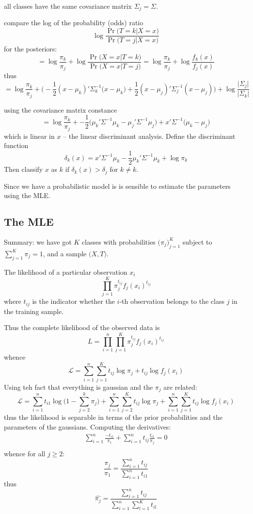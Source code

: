 \documentclass[a4paper]{article}
\begin{document}
all classes have the same covariance matrix $\Sigma_j = \Sigma$.

compare the log of the probability (odds) ratio
\[\log \frac{\Pr\big(T=k\vert X=x\big)}{\Pr\big(T=j\vert X=x\big)} \]
for the posteriors:
\[ = \log \frac{\pi_k}{\pi_j} + \log \frac{\Pr\big(X=x\vert T=k\big)}{\Pr\big(X=x\vert T=j\big)} = \log \frac{\pi_k}{\pi_j} + \log \frac{f_k(x)}{f_j(x)} \]
thus
\[ = \log \frac{\pi_k}{\pi_j} + \Big( -\frac{1}{2}(x-\mu_k)'\Sigma_k^{-1}(x-\mu_k\Big) + \frac{1}{2}(x-\mu_j)'\Sigma_j^{-1}(x-\mu_j) \Big) + \log\frac{\lvert \Sigma_j\rvert}{\lvert \Sigma_k\rvert} \]

using the covariance matrix constance
\[ = \log \frac{\pi_k}{\pi_j} + -\frac{1}{2}\big(\mu_k'\Sigma^{-1}\mu_k - \mu_j'\Sigma^{-1}\mu_j \big) + x'\Sigma^{-1}\big( \mu_k - \mu_j\big) \]
which is linear in $x$ -- the linear discriminant analysis. Define the discriminant function
\[\delta_k(x) = x'\Sigma^{-1}\mu_k - \frac{1}{2} \mu_k'\Sigma^{-1}\mu_k + \log \pi_k\]
Then  classify $x$ as $k$ if $\delta_k(x)>\delta_j$ for $k\neq k$.

Since we have a probabilistic model is is sensible to estimate the parameters using the MLE.

\subsection{The MLE} %
\label{sub:the_mle}

Summary:
we have got $K$ classes with probabilities $\big(\pi_j\big)_{j=1}^K$ subject to $\sum_{j=1}^K \pi_j = 1$, and a sample $\big(X,T\big)$.


The likelihood of a particular observation $x_i$
\[\prod_{j=1}^K \pi_j^{t_{ij}} f_j(x_i)^{t_{ij}}\]
where $t_{ij}$ is the indicator whether the $i$-th observation belongs to the class $j$ in the training sample.

Thus the complete likelihood of the observed data is
\[L = \prod_{i=1}^n \prod_{j=1}^K \pi_j^{t_{ij}} f_j(x_i)^{t_{ij}}\]
whence
\[\mathcal{L} = \sum_{i=1}^n \sum_{j=1}^K t_{ij} \log \pi_j + t_{ij} \log f_j(x_i)\]
Using teh fact that everything is gaussian and the $\pi_j$ are related:
\[\mathcal{L} = \sum_{i=1}^n t_{i1} \log \big( 1- \sum_{j=2}^k\pi_j \big) +  \sum_{i=1}^n \sum_{j=2}^K t_{ij} \log \pi_j +  \sum_{i=1}^n \sum_{j=1}^K t_{ij} \log f_j(x_i)\]
thus the likelihood is separable in terms of the prior probabilities and the parameters of the gaussians.
Computing the derivatives:
\begin{align*}
	\sum_{i=1}^n \frac{-t_{i1}}{\pi_1} +  \sum_{i=1}^n t_{ij} \frac{t_{i1}}{\pi_j} = 0\\
\end{align*}
whence for all $j\geq 2$:
\[\frac{\pi_j}{\pi_1} = \frac{\sum_{i=1}^n t_{ij}}{\sum_{i=1}^n t_{i1}}\]
thus
\[\hat{\pi_j} = \frac{\sum_{i=1}^n t_{ij}}{\sum_{i=1}^n \sum_{l=1}^K t_{il}}\]
\end{document}
